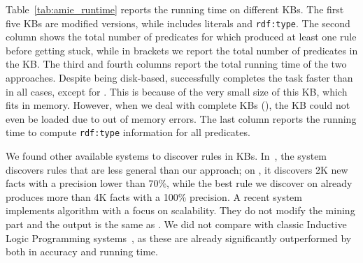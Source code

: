 Table~\ref{tab:amie_runtime} reports the running time on different KBs. The first five KBs are \amie modified versions, while  includes literals and \texttt{rdf:type}. 
The second column shows the total number of predicates for which \amie produced at least one rule before getting stuck, while in brackets we report the total number of predicates in the KB.
%
The third and fourth columns report the total running time of the two approaches. Despite being disk-based, \krd successfully completes the task faster than \amie in all cases, except for . This is because of the very small size of this KB, which fits in 
memory. However, when we deal with complete KBs (), the KB could not even be loaded due to out of memory errors. The last column reports the running time to compute \texttt{rdf:type} information for all predicates. %

We found other available systems to discover rules in KBs. In~\cite{abedjan2014amending}, the system discovers %
rules that are less general than our approach; on , it discovers 2K new facts with a precision lower than 70\%, while the best rule we discover on  already produces more than 4K facts with a 100\% precision. 
A recent system~\cite{Chen:2016} implements \amie algorithm with a focus on scalability. They do not modify the mining part
and the output is the same as \amie. We did not compare with classic Inductive Logic Programming systems~\cite{dehaspe1999discovery,Topper:2012}, as these are already significantly outperformed by \amie both in accuracy and running time.

